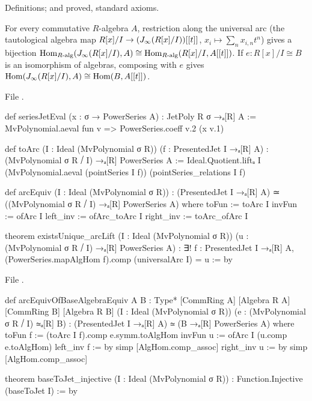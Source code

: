 \begin{status}
Definitions;  and  proved, standard axioms.
\end{status}

\begin{theorem}\label{l20:thm:arc}
For every commutative $R$-algebra $A$, restriction along the universal arc (the tautological algebra map
$R[x]/I\to(J_\infty(R[x]/I))[[t]]$, $x_i\mapsto\sum_nx_{i,n}t^n$) gives a bijection
$\operatorname{Hom}_{R\text{-alg}}(J_\infty(R[x]/I),A)\cong\operatorname{Hom}_{R\text{-alg}}(R[x]/I,A[[t]])$.
If $e\colon R[x]/I\cong B$ is an isomorphism of algebras, composing with $e$ gives
$\operatorname{Hom}(J_\infty(R[x]/I),A)\cong\operatorname{Hom}(B,A[[t]])$.
\end{theorem}
\noindent File .
\begin{leancode}
def seriesJetEval (x : σ → PowerSeries A) : JetPoly R σ →ₐ[R] A :=
  MvPolynomial.aeval fun v => PowerSeries.coeff v.2 (x v.1)

def toArc (I : Ideal (MvPolynomial σ R)) (f : PresentedJet I →ₐ[R] A) :
    (MvPolynomial σ R ⧸ I) →ₐ[R] PowerSeries A :=
  Ideal.Quotient.liftₐ I (MvPolynomial.aeval (pointSeries I f))
    (pointSeries_relations I f)

def arcEquiv (I : Ideal (MvPolynomial σ R)) :
    (PresentedJet I →ₐ[R] A) ≃ ((MvPolynomial σ R ⧸ I) →ₐ[R] PowerSeries A) where
  toFun := toArc I
  invFun := ofArc I
  left_inv := ofArc_toArc I
  right_inv := toArc_ofArc I

theorem existsUnique_arcLift (I : Ideal (MvPolynomial σ R))
    (u : (MvPolynomial σ R ⧸ I) →ₐ[R] PowerSeries A) :
    ∃! f : PresentedJet I →ₐ[R] A,
      (PowerSeries.mapAlgHom f).comp (universalArc I) = u := by
\end{leancode}
\noindent File .
\begin{leancode}
def arcEquivOfBaseAlgebraEquiv {A B : Type*} [CommRing A] [Algebra R A]
    [CommRing B] [Algebra R B] (I : Ideal (MvPolynomial σ R))
    (e : (MvPolynomial σ R ⧸ I) ≃ₐ[R] B) :
    (PresentedJet I →ₐ[R] A) ≃ (B →ₐ[R] PowerSeries A) where
  toFun f := (toArc I f).comp e.symm.toAlgHom
  invFun u := ofArc I (u.comp e.toAlgHom)
  left_inv f := by simp [AlgHom.comp_assoc]
  right_inv u := by simp [AlgHom.comp_assoc]

theorem baseToJet_injective (I : Ideal (MvPolynomial σ R)) : Function.Injective (baseToJet I) := by
\end{leancode}

